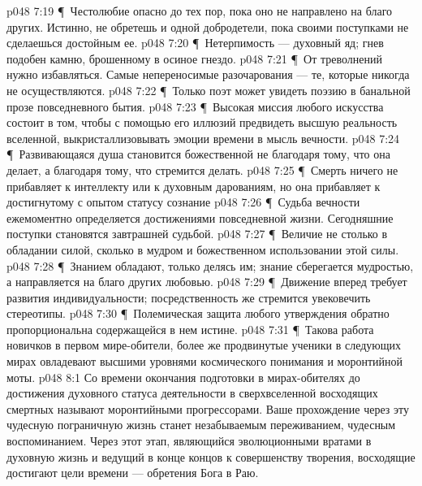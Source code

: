 \vs p048 7:19 \P\ \bibnobreakspace Честолюбие опасно до тех пор, пока оно не направлено на благо других. Истинно, не обретешь и одной добродетели, пока своими поступками не сделаешься достойным ее.
\vs p048 7:20 \P\ \bibnobreakspace Нетерпимость --- духовный яд; гнев подобен камню, брошенному в осиное гнездо.
\vs p048 7:21 \P\ \bibnobreakspace От треволнений нужно избавляться. Самые непереносимые разочарования --- те, которые никогда не осуществляются.
\vs p048 7:22 \P\ \bibnobreakspace Только поэт может увидеть поэзию в банальной прозе повседневного бытия.
\vs p048 7:23 \P\ \bibnobreakspace Высокая миссия любого искусства состоит в том, чтобы с помощью его иллюзий предвидеть высшую реальность вселенной, выкристаллизовывать эмоции времени в мысль вечности.
\vs p048 7:24 \P\ \bibnobreakspace Развивающаяся душа становится божественной не благодаря тому, что она делает, а благодаря тому, что стремится делать.
\vs p048 7:25 \P\ \bibnobreakspace Смерть ничего не прибавляет к интеллекту или к духовным дарованиям, но она прибавляет к достигнутому с опытом статусу сознание 
\vs p048 7:26 \P\ \bibnobreakspace Судьба вечности ежемоментно определяется достижениями повседневной жизни. Сегодняшние поступки становятся завтрашней судьбой.
\vs p048 7:27 \P\ \bibnobreakspace Величие не столько в обладании силой, сколько в мудром и божественном использовании этой силы.
\vs p048 7:28 \P\ \bibnobreakspace Знанием обладают, только делясь им; знание сберегается мудростью, а направляется на благо других любовью.
\vs p048 7:29 \P\ \bibnobreakspace Движение вперед требует развития индивидуальности; посредственность же стремится увековечить стереотипы.
\vs p048 7:30 \P\ \bibnobreakspace Полемическая защита любого утверждения обратно пропорциональна содержащейся в нем истине.
\vs p048 7:31 \P\ Такова работа новичков в первом мире\hyp{}обители, более же продвинутые ученики в следующих мирах овладевают высшими уровнями космического понимания и моронтийной моты.
\vs p048 8:1 Со времени окончания подготовки в мирах\hyp{}обителях до достижения духовного статуса деятельности в сверхвселенной восходящих смертных называют моронтийными прогрессорами. Ваше прохождение через эту чудесную пограничную жизнь станет незабываемым переживанием, чудесным воспоминанием. Через этот этап, являющийся эволюционными вратами в духовную жизнь и ведущий в конце концов к совершенству творения, восходящие достигают цели времени --- обретения Бога в Раю.
